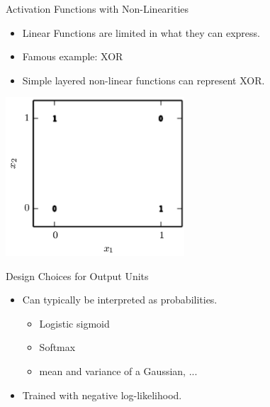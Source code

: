 
\begin{vbframe}{Activation Functions with Non-Linearities}

\vfill

\begin{itemize}
\item Linear Functions are limited in what they can express.
\item Famous example: XOR
\item Simple layered non-linear functions can represent XOR.
\end{itemize}
\begin{center}
\includegraphics[width = 0.5\textwidth]{./figure/xor}
\end{center}

\vfill

\end{vbframe}



\begin{vbframe}{Design Choices for Output Units}

\vfill

\begin{itemize}
\item Can typically be interpreted as probabilities.
\begin{itemize}
\item Logistic sigmoid
\item Softmax
\item mean and variance of a Gaussian, ...
\end{itemize}
\item Trained with negative log-likelihood.
\end{itemize}
\begin{center}
\end{center}

\vfill

\end{vbframe}


